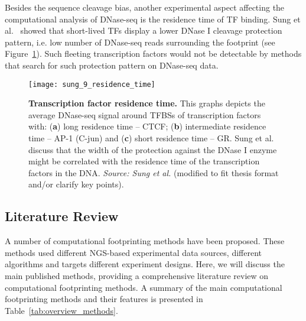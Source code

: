 Besides the sequence cleavage bias, another experimental aspect affecting the computational analysis of DNase-seq is the residence time of TF binding. Sung et al.~\cite{sung2014} showed that short-lived TFs display a lower DNase I cleavage protection pattern, i.e. low number of DNase-seq reads surrounding the footprint (see Figure~\ref{fig:sung_residence_time}). Such fleeting transcription factors would not be detectable by methods that search for such protection pattern on DNase-seq data.

\begin{figure}[h!]
\centering
\texttt{[image: sung\_9\_residence\_time]}
\caption[Transcription factor residence time]{\textbf{Transcription factor residence time.} This graphs depicts the average DNase-seq signal around TFBSs of transcription factors with: (\textbf{a}) long residence time -- CTCF; (\textbf{b}) intermediate residence time -- AP-1 (C-jun) and (\textbf{c}) short residence time -- GR. Sung et al.~\cite{sung2014} discuss that the width of the protection against the DNase I enzyme might be correlated with the residence time of the transcription factors in the DNA. \emph{Source: Sung et al.}\cite{sung2014} (modified to fit thesis format and/or clarify key points).}
\label{fig:sung_residence_time}
\end{figure}

\subsection{Literature Review}
\label{sec:literature.review}

A number of computational footprinting methods have been proposed. These methods used different NGS-based experimental data sources, different algorithms and targets different experiment designs. Here, we will discuss the main published methods, providing a comprehensive literature review on computational footprinting methods. A summary of the main computational footprinting methods and their features is presented in Table~\ref{tab:overview_methods}.

